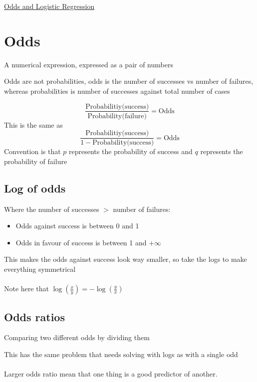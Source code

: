 \documentclass{article}[18pt]
\begin{document}
\begin{center}
\underline{\huge Odds and Logistic Regression}
\end{center}
\section{Odds}
\begin{definition}[Odds]
	A numerical expression, expressed as a pair of numbers
\end{definition}
\begin{important}
Odds are not probabilities, odds is the number of successes vs number of failures, whereas probabilities is number of successes against total number of cases
\end{important}
$$\dfrac{\text{Probabilitiy(success)}}{\text{Probability(failure)}}=\text{Odds}$$
This is the same as
$$\dfrac{\text{Probabilitiy(success)}}{1-\text{Probability(success)}}=\text{Odds}$$
Convention is that $p$ represents the probability of success and $q$ represents the probability of failure
\subsection{Log of odds}
Where the number of successes $>$ number of failures:
\begin{itemize}
	\item Odds against success is between 0 and 1
	\item Odds in favour of success is between 1 and $+\infty$
\end{itemize}
This makes the odds against success look way smaller, so take the logs to make everything symmetrical\\
\\
Note here that $\log(\frac{x}{y})=-\log(\frac{y}{x})$
\subsection{Odds ratios}
\begin{definition}
	Comparing two different odds by dividing them
\end{definition}
This has the same problem that needs solving with logs as with a single odd\\
\\
Larger odds ratio mean that one thing is a good predictor of another.
\end{document}
